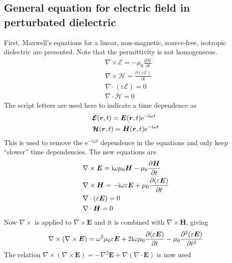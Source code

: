 \documentclass[11pt,twoside]{eitExjobb}
\begin{document}
	\subsection{General equation for electric field in perturbated dielectric \label{sec:app-derivations-scatter-general}}
	First, Maxwell's equations for a linear, non-magnetic, source-free, isotropic dielectric are presented. Note that the permittivity is not homogeneous.
	\begin{align*}
		&\nabla \times \bm{\mathcal{E}} = -\mu_0 \frac{\partial \bm{\mathcal{H}}}{\partial t} \\
		&\nabla \times \bm{\mathcal{H}} = \frac{\partial (\varepsilon \bm{\mathcal{E}})}{\partial t} \\
		&\nabla \cdot (\varepsilon \bm{\mathcal{E}}) = 0 \\
		&\nabla \cdot \bm{\mathcal{H}} = 0
	\end{align*}
	The script letters are used here to indicate a time dependence as
	\begin{align*}
		&\bm{\mathcal{E}}(\bm{r},t) = \bm{E}(\bm{r},t) \mathrm{e}^{-\mathrm{i}\omega t} \\
		&\bm{\mathcal{H}}(\bm{r},t) = \bm{H}(\bm{r},t) \mathrm{e}^{-\mathrm{i}\omega t}
	\end{align*}
	This is used to remove the e$^{-i\omega t}$ dependence in the equations and only keep ``slower'' time dependencies. The new equations are
	\begin{align}
		&\nabla \times \bm{E} = \mathrm{i}\omega \mu_0 \bm{H} - \mu_0 \frac{\partial \bm{H}}{\partial t} \label{eq:app-scatter-faraday} \\
		&\nabla \times \bm{H} = -\mathrm{i}\omega \varepsilon \bm{E} + \mu_0 \frac{\partial (\varepsilon \bm{E})}{\partial t} \label{eq:app-scatter-ampere} \\
		&\nabla \cdot (\varepsilon \bm{E}) = 0 \label{eq:app-scatter-gauss} \\
		&\nabla \cdot \bm{H} = 0 \label{eq:app-scatter-magn}
	\end{align}
	Now $\nabla \times$ is applied to $\nabla \times \bm{E}$ and it is combined with $\nabla \times \bm{H}$, giving
	\begin{equation*}
		\nabla \times (\nabla \times \bm{E}) = \omega^2 \mu_0 \varepsilon \bm{E} + 2\mathrm{i} \omega \mu_0 \frac{\partial (\varepsilon \bm{E})}{\partial t} - \mu_0 \frac{\partial^2 (\varepsilon \bm{E})}{\partial t^2}
	\end{equation*}
	The relation $\nabla \times (\nabla \times \bm{E}) = -\nabla^2\bm{E} + \nabla(\nabla \cdot \bm{E})$ is now used
\end{document}
